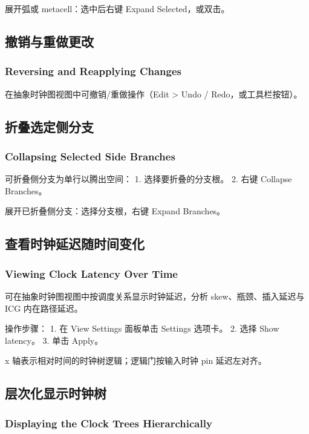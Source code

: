 展开弧或 metacell：选中后右键 Expand Selected，或双击。


\subsection{撤销与重做更改}
\subsubsection*{Reversing and Reapplying Changes}

在抽象时钟图视图中可撤销/重做操作（Edit > Undo / Redo，或工具栏按钮）。

\subsection{折叠选定侧分支}
\subsubsection*{Collapsing Selected Side Branches}

可折叠侧分支为单行以腾出空间：
1. 选择要折叠的分支根。
2. 右键 Collapse Branches。

展开已折叠侧分支：选择分支根，右键 Expand Branches。


\subsection{查看时钟延迟随时间变化}
\subsubsection*{Viewing Clock Latency Over Time}

可在抽象时钟图视图中按调度关系显示时钟延迟，分析 skew、瓶颈、插入延迟与 ICG 内在路径延迟。

操作步骤：
1. 在 View Settings 面板单击 Settings 选项卡。
2. 选择 Show latency。
3. 单击 Apply。

x 轴表示相对时间的时钟树逻辑；逻辑门按输入时钟 pin 延迟左对齐。

\subsection{层次化显示时钟树}
\subsubsection*{Displaying the Clock Trees Hierarchically}

